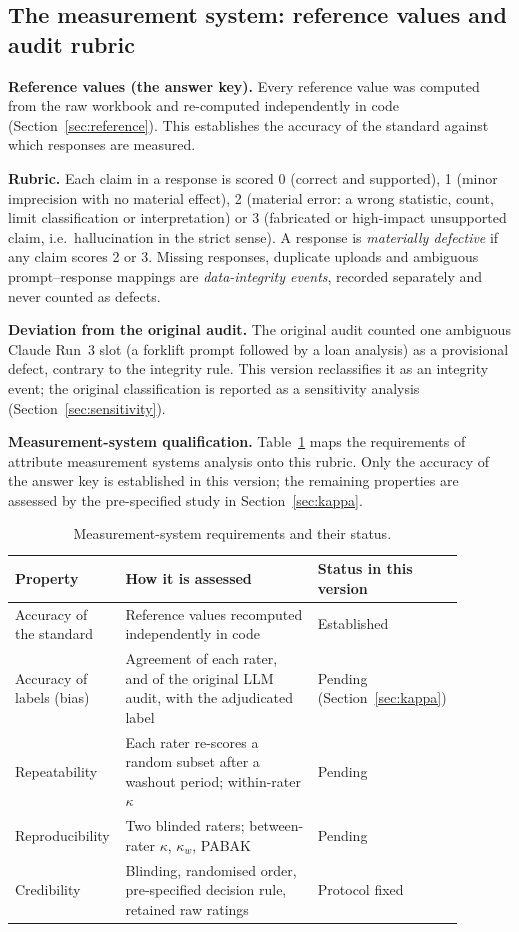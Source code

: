 \documentclass[11pt]{article}
\begin{document}
\subsection{The measurement system: reference values and audit rubric}\label{sec:rubric}
\textbf{Reference values (the answer key).} Every reference value was computed from the raw workbook and re-computed independently in code (Section~\ref{sec:reference}). This establishes the accuracy of the standard against which responses are measured.

\textbf{Rubric.} Each claim in a response is scored 0 (correct and supported), 1 (minor imprecision with no material effect), 2 (material error: a wrong statistic, count, limit classification or interpretation) or 3 (fabricated or high-impact unsupported claim, i.e.\ hallucination in the strict sense). A response is \emph{materially defective} if any claim scores 2 or 3. Missing responses, duplicate uploads and ambiguous prompt--response mappings are \emph{data-integrity events}, recorded separately and never counted as defects.

\textbf{Deviation from the original audit.} The original audit counted one ambiguous Claude Run~3 slot (a forklift prompt followed by a loan analysis) as a provisional defect, contrary to the integrity rule. This version reclassifies it as an integrity event; the original classification is reported as a sensitivity analysis (Section~\ref{sec:sensitivity}).

\textbf{Measurement-system qualification.} Table~\ref{tab:msa} maps the requirements of attribute measurement systems analysis onto this rubric. Only the accuracy of the answer key is established in this version; the remaining properties are assessed by the pre-specified study in Section~\ref{sec:kappa}.

\begin{table}[!htbp]
\centering\small
\caption{Measurement-system requirements and their status.}\label{tab:msa}
\begin{tabular}{@{}p{0.17\linewidth} p{0.42\linewidth} p{0.3\linewidth}@{}}
\toprule
Property & How it is assessed & Status in this version \\
\midrule
Accuracy of the standard & Reference values recomputed independently in code & Established \\
Accuracy of labels (bias) & Agreement of each rater, and of the original LLM audit, with the adjudicated label & Pending (Section~\ref{sec:kappa}) \\
Repeatability & Each rater re-scores a random subset after a washout period; within-rater $\kappa$ & Pending \\
Reproducibility & Two blinded raters; between-rater $\kappa$, $\kappa_w$, PABAK & Pending \\
Credibility & Blinding, randomised order, pre-specified decision rule, retained raw ratings & Protocol fixed \\
\bottomrule
\end{tabular}
\end{table}
\end{document}
